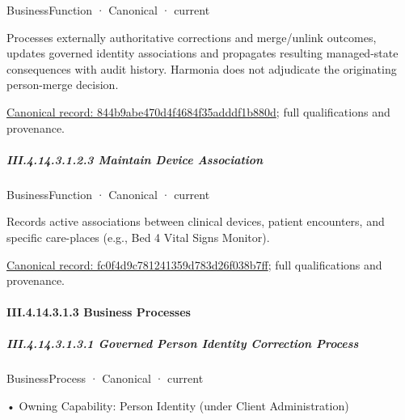 \label{element:844b9abe470d4f4684f35adddf1b880d}
{\small BusinessFunction · Canonical · current}\par

Processes externally authoritative corrections and merge/unlink outcomes, updates governed identity associations and propagates resulting managed-state consequences with audit history. Harmonia does not adjudicate the originating person-merge decision.


{\footnotesize \href{../../../../../../../continuum/business/business-function/844b9abe470d4f4684f35adddf1b880d.md}{Canonical record: 844b9abe470d4f4684f35adddf1b880d}; full qualifications and provenance.}\par
\subparagraph*{III.4.14.3.1.2.3 Maintain Device Association}
\label{navigation:III.4.14.3.1.2.3}

\label{element:fc0f4d9c781241359d783d26f038b7ff}
{\small BusinessFunction · Canonical · current}\par

Records active associations between clinical devices, patient encounters, and specific care-places (e.g., Bed 4 Vital Signs Monitor).


{\footnotesize \href{../../../../../../../continuum/business/business-function/fc0f4d9c781241359d783d26f038b7ff.md}{Canonical record: fc0f4d9c781241359d783d26f038b7ff}; full qualifications and provenance.}\par
\paragraph*{III.4.14.3.1.3 Business Processes}
\label{navigation:III.4.14.3.1.3}

\subparagraph*{III.4.14.3.1.3.1 Governed Person Identity Correction Process}
\label{navigation:III.4.14.3.1.3.1}

\label{element:72f3c63da45d44868579a3bb15d1568c}
{\small BusinessProcess · Canonical · current}\par

•
Owning Capability: Person Identity (under Client Administration)



